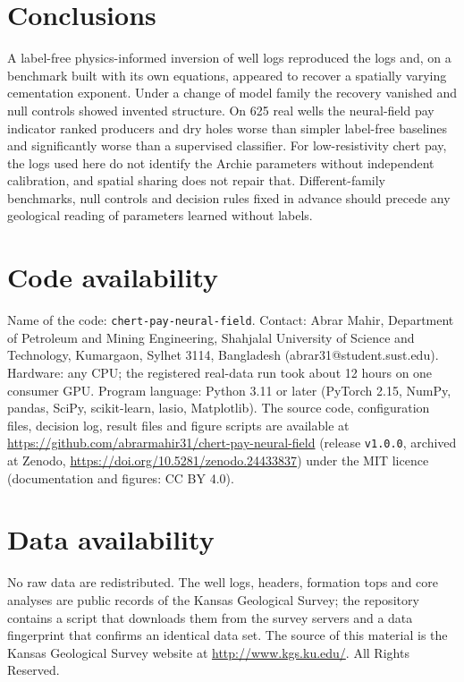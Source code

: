 \documentclass[preprint,12pt]{elsarticle}
\begin{document}
\section{Conclusions}
A label-free physics-informed inversion of well logs reproduced the logs and, on a benchmark
built with its own equations, appeared to recover a spatially varying cementation exponent.
Under a change of model family the recovery vanished and null controls showed invented
structure. On 625 real wells the neural-field pay indicator ranked producers and dry holes
worse than simpler label-free baselines and significantly worse than a supervised classifier.
For low-resistivity chert pay, the logs used here do not identify the Archie parameters
without independent calibration, and spatial sharing does not repair that. Different-family
benchmarks, null controls and decision rules fixed in advance should precede any geological
reading of parameters learned without labels.

\section*{Code availability}
Name of the code: \texttt{chert-pay-neural-field}. Contact: Abrar Mahir, Department of Petroleum and Mining Engineering, Shahjalal University of Science and Technology, Kumargaon, Sylhet 3114, Bangladesh (abrar31@student.sust.edu).
Hardware: any CPU; the registered real-data run took about 12 hours on one consumer GPU.
Program language: Python 3.11 or later (PyTorch 2.15, NumPy, pandas, SciPy, scikit-learn,
lasio, Matplotlib). The source code, configuration files, decision log, result files and
figure scripts are available at
\url{https://github.com/abrarmahir31/chert-pay-neural-field} (release \texttt{v1.0.0}, archived at Zenodo, \url{https://doi.org/10.5281/zenodo.24433837}) under the MIT licence
(documentation and figures: CC BY 4.0).


\section*{Data availability}
No raw data are redistributed. The well logs, headers, formation tops and core analyses are
public records of the Kansas Geological Survey; the repository contains a script that downloads
them from the survey servers and a data fingerprint that confirms an identical data set. The
source of this material is the Kansas Geological Survey website at
\url{http://www.kgs.ku.edu/}. All Rights Reserved.
\end{document}
